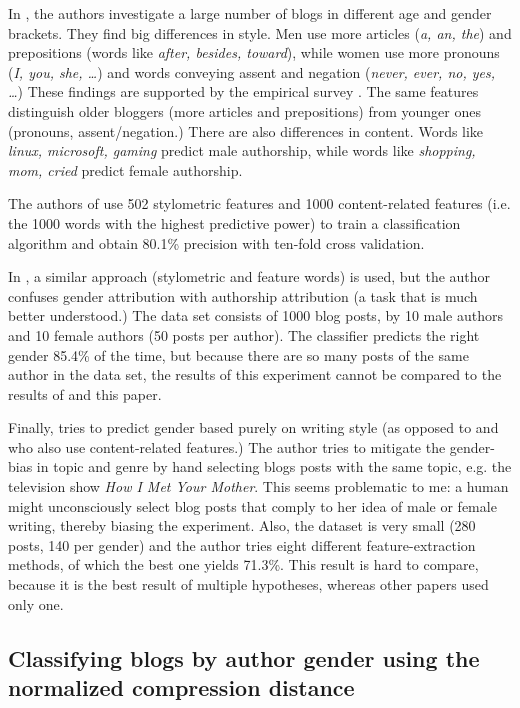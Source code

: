 In \cite{Schler2005}, the authors investigate a large number of blogs in
different age and gender brackets. They find big differences in style. Men
use more articles (\emph{a, an, the}) and prepositions (words like
\emph{after, besides, toward}), while women use more pronouns (\emph{I,
you, she, \dots}) and words conveying assent and negation (\emph{never,
ever, no, yes, \dots}) These findings are supported by the empirical
survey \cite{Mulac2001}. The same features distinguish older bloggers
(more articles and prepositions) from younger ones (pronouns,
assent/negation.) There are also differences in content. Words like
\emph{linux, microsoft, gaming} predict male authorship, while words like
\emph{shopping, mom, cried} predict female authorship.

The authors of \cite{Schler2005} use 502 stylometric features and 1000
content-related features (i.e. the 1000 words with the highest predictive
power) to train a classification algorithm and obtain 80.1\% precision
with ten-fold cross validation.

In \cite{Mikros2013}, a similar approach (stylometric and feature words) is used, but the author confuses gender attribution with authorship attribution (a task that is much better understood.) The data set consists of 1000 blog posts, by 10 male authors and 10 female authors (50 posts per author). The classifier predicts the right gender 85.4\% of the time, but because there are so many posts of the same author in the data set, the results of this experiment cannot be compared to the results of \cite{Schler2005} and this paper.

Finally, \cite{Sarawgi2011} tries to predict gender based purely on writing style (as opposed to \cite{Schler2005} and \cite{Mikros2013} who also use content-related features.) The author tries to mitigate the gender-bias in topic and genre by hand selecting blogs posts with the same topic, e.g. the television show \emph{How I Met Your Mother}. This seems problematic to me: a human might unconsciously select blog posts that comply to her idea of male or female writing, thereby biasing the experiment. Also, the dataset is very small (280 posts, 140 per gender) and the author tries eight different feature-extraction methods, of which the best one yields 71.3\%. This result is hard to compare, because it is the best result of multiple hypotheses, whereas other papers used only one.

\subsection{Classifying blogs by author gender using the normalized compression distance}
